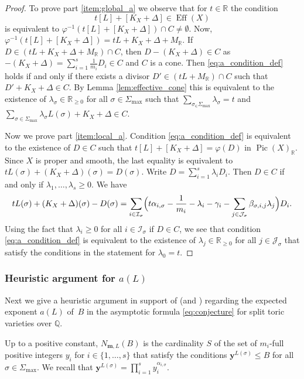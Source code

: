 \documentclass[11pt]{article}
\numberwithin{equation}{section}
\newcommand{\bfy}{\boldsymbol{y}}
\newcommand{\bfm}{{\boldsymbol{m}}}
\newcommand\RR{\mathbb{R}}
\newcommand\QQ{\mathbb{Q}}
\newcommand{\ii}[1]{\mathcal{J}_{#1}}
\newcommand{\ic}[1]{\mathcal{I}_{#1}}
\DeclareMathOperator{\pic}{Pic}
\DeclareMathOperator{\eff}{Eff}
\theoremstyle{definition}
\numberwithin{theorem}{section}
\begin{document}
\begin{proof}
To prove part \eqref{item:global_a} we observe that for $t\in\RR$ the condition
\begin{equation}
\label{eq:a_condition_def}
t[L]+[K_X+\Delta] \in \eff(X)
\end{equation}
is equivalent to $\varphi^{-1}(t[L]+[K_X+\Delta])\cap C\neq\emptyset$.
Now, $\varphi^{-1}(t[L]+[K_X+\Delta])=tL+K_X+\Delta+M_\RR$.
If $D\in (tL+K_X+\Delta+M_\RR)\cap C$, then $D-(K_X+\Delta)\in C$ as
$-(K_X+\Delta)=\sum_{i=1}^s\frac 1{m_i}D_i\in C$ and $C$ is a cone.
Then \eqref{eq:a_condition_def} holds if and only if there exists a divisor
$D'\in (tL+M_\RR)\cap C$ such that $D'+K_X+\Delta\in C$.
By Lemma \ref{lem:effective_cone} this is equivalent to the existence of
$\lambda_\sigma\in\RR_{\geq0}$ for all $\sigma\in\Sigma_{\max}$ such that
$\sum_{\sigma_\in\Sigma_{\max}}\lambda_\sigma=t$ and
$\sum_{\sigma\in\Sigma_{\max}}\lambda_\sigma L(\sigma)+K_X+\Delta\in C$.

Now we prove part \eqref{item:local_a}. Condition \eqref{eq:a_condition_def} is
equivalent to the existence of $D\in C$ such that $t[L]+[K_X+\Delta]=\varphi(D)$ in
$\pic(X)_\RR$. Since $X$ is proper and smooth, the last equality is
equivalent to $tL(\sigma)+(K_X+\Delta)(\sigma)=D(\sigma)$.
Write $D=\sum_{i=1}^s\lambda_i D_i$.
Then $D\in C$ if and only if $\lambda_1,\dots,\lambda_s\geq0$.
We have
\[
tL(\sigma)+(K_X+\Delta)(\sigma)-D(\sigma)
=\sum_{i\in\ic{\sigma}}\Bigl(t \alpha_{i,\sigma} -\frac 1{m_i}-\lambda_{i}-\gamma_i
-\sum_{j\in \ii{\sigma}}\beta_{\sigma,i,j}\lambda_j\Bigr)D_{i}.
\]
Using the fact that $\lambda_{i}\geq0$ for all $i\in\ic{\sigma}$ if $D\in C$,
we see that condition \eqref{eq:a_condition_def} is equivalent to the existence of
$\lambda_j\in\RR_{\geq0}$ for all $j\in\ii{\sigma}$ that satisfy the conditions in
the statement for $\lambda_0=t$.
\end{proof}

\subsubsection{Heuristic argument for $a(L)$}
Next we give a heuristic argument in support of \cite[Conj.\,1.1]{PSTVA}
(and \cite[\S3.3]{MR1032922})
regarding the expected exponent $a(L)$ of~$B$ in the asymptotic
formula \eqref{eq:conjecture} for split toric varieties over $\QQ$.

Up to a positive constant, $N_{\bfm,L}(B)$ is the cardinality $S$ of the set of $m_i$-full positive integers $y_i$ for $i\in\{1,\dots,s\}$ that satisfy the conditions $\bfy^{L(\sigma)}\leq B$ for all $\sigma\in\Sigma_{\max}$. We recall that $\bfy^{L(\sigma)}=\prod_{i=1}^s y_i^{\alpha_{i,\sigma}}$.
\end{document}
